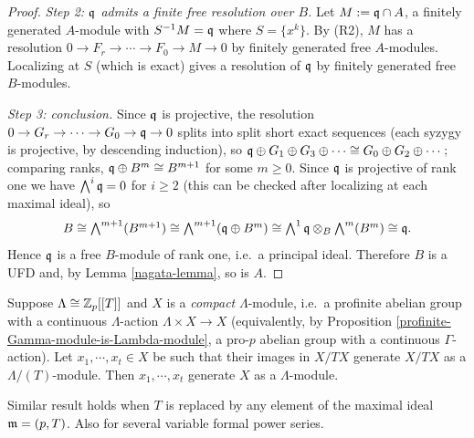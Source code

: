 \begin{proof}
\emph{Step 2: ${\mathfrak{q}}$ admits a finite free resolution over $B$.}
Let $M:={\mathfrak{q}}\cap A$, a finitely generated $A$-module with $S^{-1}M={\mathfrak{q}}$ where
$S=\{x^k\}$. By (R2), $M$ has a resolution
$0\to F_r\to\cdots\to F_0\to M\to 0$ by finitely generated free $A$-modules.
Localizing at $S$ (which is exact) gives a resolution of ${\mathfrak{q}}$ by finitely
generated free $B$-modules.

\emph{Step 3: conclusion.}
Since ${\mathfrak{q}}$ is projective, the resolution
$0\to G_r\to\cdots\to G_0\to{\mathfrak{q}}\to 0$ splits into split short exact sequences
(each syzygy is projective, by descending induction), so
${\mathfrak{q}}\oplus G_1\oplus G_3\oplus\cdots\cong G_0\oplus G_2\oplus\cdots$;
comparing ranks, ${\mathfrak{q}}\oplus B^m\cong B^{m+1}$ for some $m\geq 0$.
Since ${\mathfrak{q}}$ is projective of rank one we have $\bigwedge^i{\mathfrak{q}}=0$ for $i\geq 2$
(this can be checked after localizing at each maximal ideal), so
$$B\cong\textstyle\bigwedge^{m+1}(B^{m+1})\cong\bigwedge^{m+1}({\mathfrak{q}}\oplus B^m)
\cong\bigwedge^1{\mathfrak{q}}\otimes_B\bigwedge^m(B^m)\cong{\mathfrak{q}} .$$
Hence ${\mathfrak{q}}$ is a free $B$-module of rank one, i.e.~a principal ideal.
Therefore $B$ is a UFD and, by Lemma \ref{nagata-lemma}, so is $A$.
\end{proof}

\begin{lem}\label{p:nak}
\leanok
Suppose $\Lambda\cong{\mathbb {Z}}_p[[T]]$ and $X$ is a \emph{compact} $\Lambda$-module,
i.e.~a profinite abelian group with a continuous $\Lambda$-action
$\Lambda\times X\to X$ (equivalently, by Proposition
\ref{profinite-Gamma-module-is-Lambda-module}, a pro-$p$ abelian group with a
continuous $\Gamma$-action).
Let $x_1,\cdots,x_t\in X$ be such that their images in $X/TX$
generate $X/TX$ as a $\Lambda/(T)$-module.
Then $x_1,\cdots,x_t$ generate $X$ as a $\Lambda$-module.
\end{lem}

Similar result holds when $T$ is replaced
by any element of the maximal ideal ${\mathfrak{m}}=(p,T)$.
Also for several variable formal power series.

